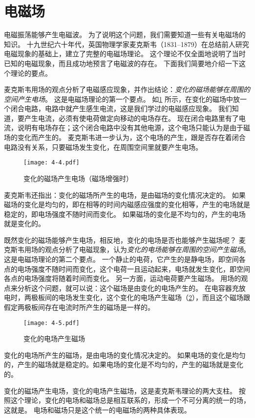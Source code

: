 \section{电磁场}
电磁振荡能够产生电磁波。
为了说明这个问题，我们需要知道一些有关电磁场的知识。
十九世纪六十年代，英国物理学家麦克斯韦（1831--1879）在总结前人研究电磁现象的基础上，建立了完整的电磁场理论。
这个理论不仅全面地说明了当时已知的电磁现象，而且成功地预言了电磁波的存在。
下面我们简要地介绍一下这个理论的要点。

麦克斯韦用场的观点分析了电磁感应现象，并作出结论：\emph{变化的磁场能够在周围的空间产生电场}。
这是电磁场理论的第一个要点。
如\cref{fig:4-4} 所示，在变化的磁场中放一个闭合电路，电路中就产生感生电流，这是我们学过的电磁感应现象。
我们知道，要产生电流，必须有使电荷做定向移动的电场存在。
现在闭合电路里有了电流，说明有电场存在；这个闭合电路中没有其他电源，这个电场只能认为是由于磁场的变化而产生的。
麦克斯韦进一步认为，这个电场的产生，跟是否存在着闭合电路没有关系，只要磁场发生变化，在周围空间里就要产生电场。
\begin{figure}
	\texttt{[image: 4-4.pdf]}
	\caption{变化的磁场产生电场（磁场增强时）}\label{fig:4-4}
\end{figure}

麦克斯韦还指出：变化的磁场所产生的电场，是由磁场的变化情况决定的。
如果磁场的变化是均匀的，即在相等的时间内磁感应强度的变化相等，产生的电场就是稳定的，即电场强度不随时间而变化。
如果磁场的变化是不均匀的，产生的电场就是变化的。

既然变化的磁场能够产生电场，相反地，变化的电场是否也能够产生磁场呢？
麦克斯韦用场的观点分析了电磁现象，认为\emph{变化的电场能够在周围的空间产生磁场}。
这是电磁场理论的第二个要点。
一个静止的电荷，它产生的是静电场，即空间各点的电场强度不随时间而变化，这个电荷一且运动起来，电场就发生变化，即空间各点的电场强度将随着时间而变化。
另一方面，运动电荷要产生磁场。
用场的观点来分析这个问题，就可以说：这个磁场是由变化的电场产生的。
在电容器充放电时，两极板间的电场发生变化，这个变化的电场产生磁场（\cref{fig:4-5}），而且这个磁场跟假定两极板间存在电流时所产生的磁场是一样的。
\begin{figure}
\texttt{[image: 4-5.pdf]}
\caption{变化的电场产生磁场}\label{fig:4-5}
\end{figure}

变化的电场所产生的磁场，是由电场的变化情况决定的。
如果电场的变化是均匀的，产生的磁场就是稳定的。如果电场的变化是不均匀的，产生的磁场就是变化的。

变化的磁场产生电场，变化的电场产生磁场，这是麦克斯韦理论的两大支柱。
按照这个理论，变化的电场和磁场总是相互联系的，形成一个不可分离的统一的场，这就是。
电场和磁场只是这个统一的电磁场的两种具体表现。

